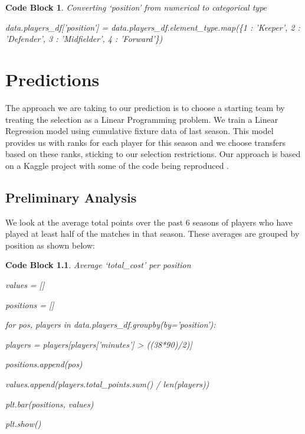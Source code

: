 \documentclass[12pt, a4paper, oneside]{book}
\newtheorem{codeblock}[theorem]{Code Block}
\numberwithin{equation}{section}
\begin{document}
\begin{codeblock}
  Converting `position' from numerical to categorical type

  data.players\_df['position'] = data.players\_df.element\_type.map(\{1 : 'Keeper', 2 : 'Defender', 3 : 'Midfielder', 4 : 'Forward'\})
\end{codeblock}


\chapter{Predictions}\label{ch:5}

The approach we are taking to our prediction is to choose a starting team by treating the selection as a Linear Programming problem. We train a Linear Regression model using cumulative fixture data of last season. This model provides us with ranks for each player for this season and we choose transfers based on these ranks, sticking to our selection restrictions. Our approach is based on a Kaggle project with some of the code being reproduced \cite{kaggle project}.

\section{Preliminary Analysis}\label{sec:5.1}

We look at the average total points over the past 6 seasons of players who have played at least half of the matches in that season. These averages are grouped by position as shown below:

\begin{codeblock}
  Average `total\_cost' per position

  values = []
  
  positions = []

  for pos, players in data.players\_df.groupby(by='position'):

  \hspace{\parindent}players = players[players['minutes'] > ((38*90)/2)]

  \hspace{\parindent}positions.append(pos)
  
  values.append(players.total\_points.sum() / len(players))

  plt.bar(positions, values)
  
  plt.show()
\end{codeblock}
\end{document}
